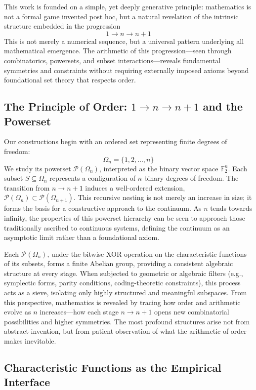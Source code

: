 \documentclass[11pt,a4paper]{article}
\begin{document}
This work is founded on a simple, yet deeply generative principle: mathematics is not a formal game invented post hoc, but a natural revelation of the intrinsic structure embedded in the progression
\[1 \to n \to n+1\]
This is not merely a numerical sequence, but a universal pattern underlying all mathematical emergence. The arithmetic of this progression—seen through combinatorics, powersets, and subset interactions—reveals fundamental symmetries and constraints without requiring externally imposed axioms beyond foundational set theory that respects order.

\subsection{The Principle of Order: $1 \to n \to n+1$ and the Powerset}

Our constructions begin with an ordered set representing finite degrees of freedom:
\[ \Omega_n = \{1, 2, \dots, n\} \]
We study its powerset $\mathcal{P}(\Omega_n)$, interpreted as the binary vector space $\mathbb{F}_2^n$. Each subset $S \subseteq \Omega_n$ represents a configuration of $n$ binary degrees of freedom. The transition from $n \to n+1$ induces a well-ordered extension, $\mathcal{P}(\Omega_n) \subset \mathcal{P}(\Omega_{n+1})$. This recursive nesting is not merely an increase in size; it forms the basis for a constructive approach to the continuum. As $n$ tends towards infinity, the properties of this powerset hierarchy can be seen to approach those traditionally ascribed to continuous systems, defining the continuum as an asymptotic limit rather than a foundational axiom.

Each $\mathcal{P}(\Omega_n)$, under the bitwise XOR operation on the characteristic functions of its subsets, forms a finite Abelian group, providing a consistent algebraic structure at every stage. When subjected to geometric or algebraic filters (e.g., symplectic forms, parity conditions, coding-theoretic constraints), this process acts as a sieve, isolating only highly structured and meaningful subspaces. From this perspective, mathematics is revealed by tracing how order and arithmetic evolve as $n$ increases—how each stage $n \to n+1$ opens new combinatorial possibilities and higher symmetries. The most profound structures arise not from abstract invention, but from patient observation of what the arithmetic of order makes inevitable.

\subsection{Characteristic Functions as the Empirical Interface}
\end{document}
